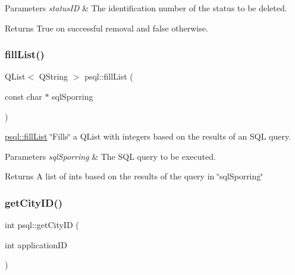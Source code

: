 \begin{DoxyParams}{Parameters}
{\em status\+ID} & The identification number of the status to be deleted. \\
\hline
\end{DoxyParams}
\begin{DoxyReturn}{Returns}
True on successful removal and false otherwise. 
\end{DoxyReturn}
\mbox{\label{classpsql_a2ad41caea89dc5af0b55b12f6394fbf5}} 
\subsubsection{\texorpdfstring{fill\+List()}{fillList()}}
{\footnotesize\ttfamily Q\+List$<$ Q\+String $>$ psql\+::fill\+List (\begin{DoxyParamCaption}\item[{const char $\ast$}]{sql\+Sporring }\end{DoxyParamCaption})}



\mbox{\hyperlink{classpsql_a2ad41caea89dc5af0b55b12f6394fbf5}{psql\+::fill\+List}} \char`\"{}\+Fills\char`\"{} a Q\+List with integers based on the results of an S\+QL query. 


\begin{DoxyParams}{Parameters}
{\em sql\+Sporring} & The S\+QL query to be executed. \\
\hline
\end{DoxyParams}
\begin{DoxyReturn}{Returns}
A list of ints based on the results of the query in \char`\"{}sql\+Sporring\char`\"{} 
\end{DoxyReturn}
\mbox{\label{classpsql_af3462a12dc106e0ca8df4fa8fcf28436}} 
\subsubsection{\texorpdfstring{get\+City\+I\+D()}{getCityID()}\hspace{0.1cm}{\footnotesize\ttfamily [1/2]}}
{\footnotesize\ttfamily int psql\+::get\+City\+ID (\begin{DoxyParamCaption}\item[{int}]{application\+ID }\end{DoxyParamCaption})}



